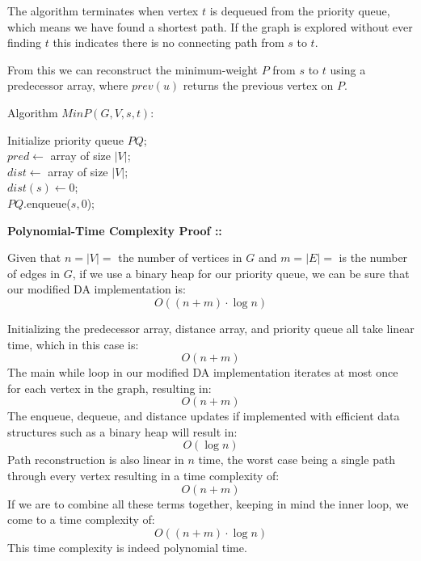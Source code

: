 \documentclass[11pt]{article}
\begin{document}
\vspace{5px}The algorithm terminates when vertex $t$ is dequeued from the priority
queue, which means we have found a shortest path. If the graph is explored without
ever finding $t$ this indicates there is no connecting path from $s$ to $t$.

\vspace{5px}From this we can reconstruct the minimum-weight $P$ from $s$ to $t$
using a predecessor array, where $prev(u)$ returns the previous vertex on $P$.

\vspace{10px}Algorithm $MinP(G, V, s, t)$:
\begin{algorithm}
    Initialize priority queue $PQ$; \\
    $pred \gets$ array of size $|V|$; \\
    $dist \gets$ array of size $|V|$; \\
    $dist(s)\gets 0$; \\
    $PQ$.enqueue($s,0$); \\
\end{algorithm}

\pagebreak
\textbf{Polynomial-Time Complexity Proof ::}

Given that $n = |V|=$ the number of vertices in $G$ and $m = |E| =$ is the number of edges
in $G$, if we use a binary heap for our priority queue, we can be sure that our
modified DA implementation is:
$$O((n+m)\cdot\log n)$$

Initializing the predecessor array, distance array, and priority queue all take linear
time, which in this case is:
$$O(n + m)$$
The main while loop in our modified DA implementation iterates at most once for each
vertex in the graph, resulting in:
$$O(n + m)$$
The enqueue, dequeue, and distance updates if implemented with efficient data structures
such as a binary heap will result in:
$$O(\log n)$$
Path reconstruction is also linear in $n$ time, the worst case being a single path through
every vertex resulting in a time complexity of:
$$O(n + m)$$
If we are to combine all these terms together, keeping in mind the inner loop, we come
to a time complexity of:
$$O((n+m)\cdot\log n)$$
This time complexity is indeed polynomial time.
\pagebreak
\end{document}
